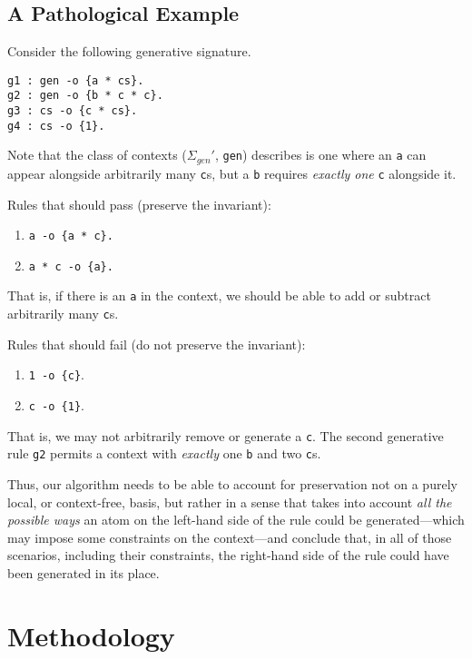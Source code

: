 \documentclass[fullpage, 11pt]{article}
\begin{document}
\subsection{A Pathological Example}

Consider the following generative signature.

\begin{verbatim}
g1 : gen -o {a * cs}.
g2 : gen -o {b * c * c}.
g3 : cs -o {c * cs}.
g4 : cs -o {1}.
\end{verbatim}

Note that the class of contexts ($\Sigma_{gen}'$, \verb|gen|) describes is
one where an \verb|a| can appear alongside arbitrarily many \verb|c|s, but
a \verb|b| requires {\em exactly one} \verb|c| alongside it.


Rules that should pass (preserve the invariant):
\begin{enumerate}
\item \verb|a -o {a * c}.|
\item \verb|a * c -o {a}.|
\end{enumerate}

That is, if there is an \verb|a| in the context, we should be able to add
or subtract arbitrarily many \verb|c|s.

Rules that should fail (do not preserve the invariant):
\begin{enumerate}
\item \verb|1 -o {c}|.
\item \verb|c -o {1}|.
\end{enumerate}

That is, we may not arbitrarily remove or generate a \verb|c|. The second
generative rule \verb|g2| permits a context with {\em exactly} one \verb|b|
and two \verb|c|s.

Thus, our algorithm needs to be able to account for preservation not on a purely
local, or context-free, basis, but rather in a sense that takes into
account {\em all the possible ways} an atom on the left-hand side of the
rule could be generated---which may impose some constraints on the
context---and conclude that, in all of those scenarios, including their
constraints, the right-hand side of the rule could have been generated in
its place.

\section{Methodology}
\label{sec:method}
\end{document}
